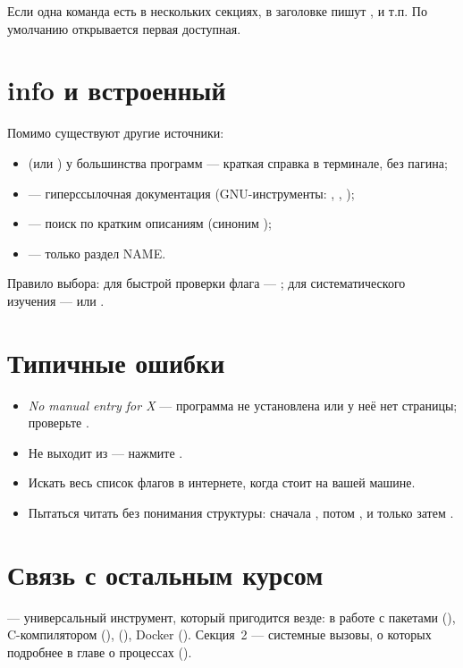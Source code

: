 Если одна команда есть в нескольких секциях, в заголовке
пишут ,  и т.п. По умолчанию
открывается первая доступная.

\section{info и встроенный }

Помимо  существуют другие источники:
\begin{itemize}
  \item {} (или ) у большинства программ
    --- краткая справка в терминале, без пагина;
  \item {} --- гиперссылочная документация
    (GNU-инструменты: , , );
  \item {} --- поиск по кратким описаниям
    (синоним );
  \item {} --- только раздел NAME.
\end{itemize}

Правило выбора: для быстрой проверки флага ---
; для систематического изучения ---
 или .

\section{Типичные ошибки}
\begin{itemize}
  \item \emph{No manual entry for X} --- программа не
    установлена или у неё нет страницы; проверьте
    .
  \item Не выходит из  --- нажмите .
  \item Искать весь список флагов в интернете, когда
     стоит на вашей машине.
  \item Пытаться читать  без понимания структуры:
    сначала , потом , и только
    затем .
\end{itemize}

\section{Связь с остальным курсом}

 --- универсальный инструмент, который пригодится
везде: в работе с пакетами
(), C-компилятором
(), 
(), Docker ().
Секция~2 --- системные вызовы, о которых подробнее в главе
о процессах ().

